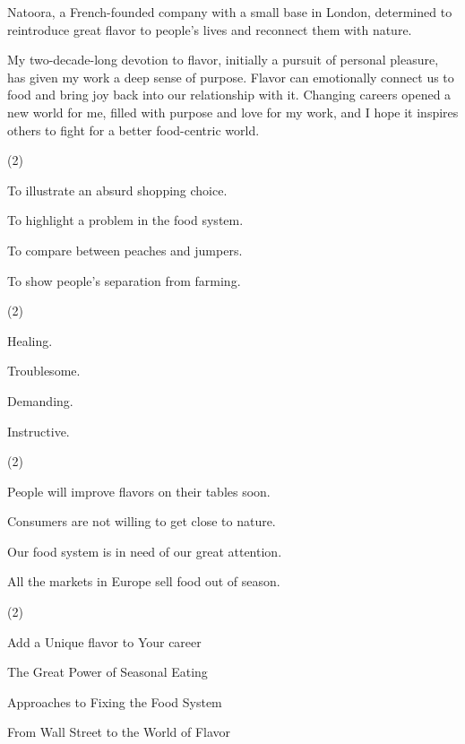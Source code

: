 \documentclass{英语试卷}
\begin{document}
\par Natoora, a French-founded company with a small base in London, determined to reintroduce great flavor to people's lives and reconnect them with nature.\par
\par My two-decade-long devotion to flavor, initially a pursuit of personal pleasure, has given my work a deep sense of purpose. Flavor can emotionally connect us to food and bring joy back into our relationship with it. Changing careers opened a new world for me, filled with purpose and love for my work, and I hope it inspires others to fight for a better food-centric world.\par
{}
\begin{choices}(2)
  \item To illustrate an absurd shopping choice.
  \item To highlight a problem in the food system.
  \item To compare between peaches and jumpers.
  \item To show people's separation from farming.
\end{choices}
\begin{choices}(2)
  \item Healing.
  \item Troublesome.
  \item Demanding.
  \item Instructive.
\end{choices}
\begin{choices}(2)
  \item People will improve flavors on their tables soon.
  \item Consumers are not willing to get close to nature.
  \item Our food system is in need of our great attention.
  \item All the markets in Europe sell food out of season.
\end{choices}
\begin{choices}(2)
  \item Add a Unique flavor to Your career
  \item The Great Power of Seasonal Eating
  \item Approaches to Fixing the Food System
  \item From Wall Street to the World of Flavor
\end{choices}
\end{document}
